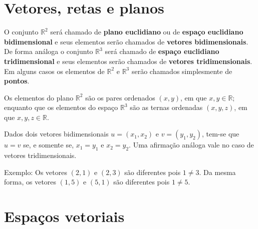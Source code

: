 \documentclass[12pt,a4paper]{report}
\newcommand{\R}{\mathbb{R}}
\begin{document}
\chapter{Vetores, retas e planos}
O conjunto $\R^2$ será chamado de \textbf{plano euclidiano} ou de \textbf{espaço euclidiano bidimensional} e seus elementos serão chamados de \textbf{vetores bidimensionais}. De forma análoga o conjunto $\R^3$ será chamado de \textbf{espaço euclidiano tridimensional} e seus elementos serão chamados de \textbf{vetores tridimensionais}. Em alguns casos os elementos de $\R^2$ e $\R^3$ serão chamados simplesmente de \textbf{pontos}.

Os elementos do plano $\R^2$ são os pares ordenados $(x,y)$, em que $x,y\in\R$; enquanto que os elementos do espaço $\R^3$ são as ternas ordenadas $(x,y,z)$, em que $x,y,z\in\R$.

Dados dois vetores bidimensionais $u=(x_1,x_2)$ e $v=(y_1,y_2)$, tem-se que $u=v$ se, e somente se, $x_1=y_1$ e $x_2=y_2$. Uma afirmação análoga vale no caso de vetores tridimensionais.

Exemplo: Os vetores $(2,1)$ e $(2,3)$ são diferentes pois $1\ne 3$. Da mesma forma, os vetores $(1,5)$ e $(5,1)$ são diferentes pois $1\ne 5$.



\chapter{Espaços vetoriais}
\end{document}
